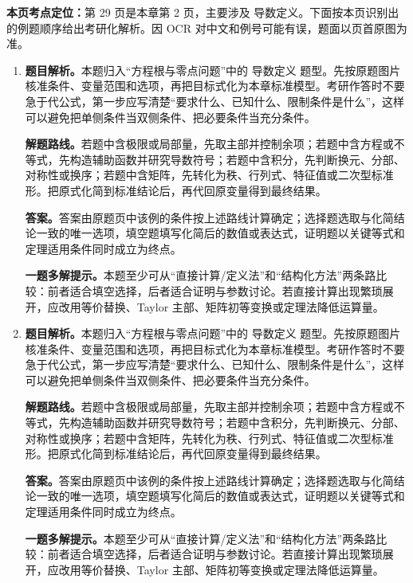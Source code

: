 \begin{solutionblock}
\textbf{本页考点定位：}第 29 页是本章第 2 页，主要涉及 导数定义。下面按本页识别出的例题顺序给出考研化解析。因 OCR 对中文和例号可能有误，题面以页首原图为准。

\begin{enumerate}[label=\textbf{例\arabic*.}, leftmargin=2.4em]

\item \textbf{题目解析。}本题归入“方程根与零点问题”中的 导数定义 题型。先按原题图片核准条件、变量范围和选项，再把目标式化为本章标准模型。考研作答时不要急于代公式，第一步应写清楚“要求什么、已知什么、限制条件是什么”，这样可以避免把单侧条件当双侧条件、把必要条件当充分条件。

\textbf{解题路线。}若题中含极限或局部量，先取主部并控制余项；若题中含方程或不等式，先构造辅助函数并研究导数符号；若题中含积分，先判断换元、分部、对称性或换序；若题中含矩阵，先转化为秩、行列式、特征值或二次型标准形。把原式化简到标准结论后，再代回原变量得到最终结果。

\textbf{答案。}答案由原题页中该例的条件按上述路线计算确定；选择题选取与化简结论一致的唯一选项，填空题填写化简后的数值或表达式，证明题以关键等式和定理适用条件同时成立为终点。

\textbf{一题多解提示。}本题至少可从“直接计算/定义法”和“结构化方法”两条路比较：前者适合填空选择，后者适合证明与参数讨论。若直接计算出现繁琐展开，应改用等价替换、Taylor 主部、矩阵初等变换或定理法降低运算量。

\item \textbf{题目解析。}本题归入“方程根与零点问题”中的 导数定义 题型。先按原题图片核准条件、变量范围和选项，再把目标式化为本章标准模型。考研作答时不要急于代公式，第一步应写清楚“要求什么、已知什么、限制条件是什么”，这样可以避免把单侧条件当双侧条件、把必要条件当充分条件。

\textbf{解题路线。}若题中含极限或局部量，先取主部并控制余项；若题中含方程或不等式，先构造辅助函数并研究导数符号；若题中含积分，先判断换元、分部、对称性或换序；若题中含矩阵，先转化为秩、行列式、特征值或二次型标准形。把原式化简到标准结论后，再代回原变量得到最终结果。

\textbf{答案。}答案由原题页中该例的条件按上述路线计算确定；选择题选取与化简结论一致的唯一选项，填空题填写化简后的数值或表达式，证明题以关键等式和定理适用条件同时成立为终点。

\textbf{一题多解提示。}本题至少可从“直接计算/定义法”和“结构化方法”两条路比较：前者适合填空选择，后者适合证明与参数讨论。若直接计算出现繁琐展开，应改用等价替换、Taylor 主部、矩阵初等变换或定理法降低运算量。

\end{enumerate}
\end{solutionblock}



